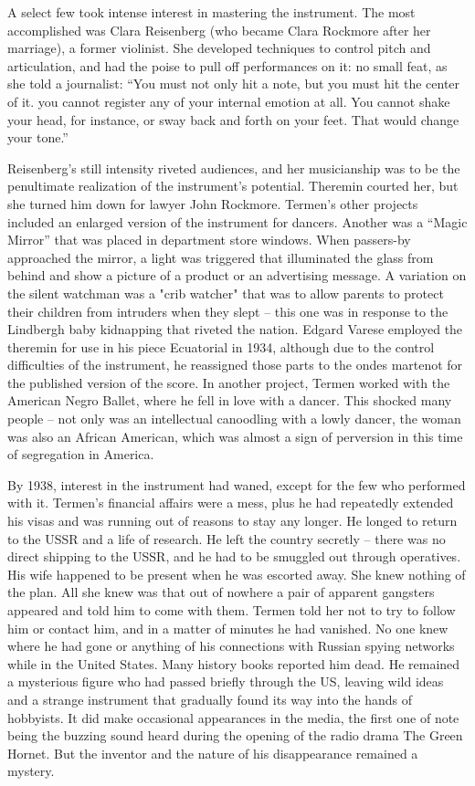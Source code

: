 A select few took intense interest in mastering the instrument. The most accomplished was Clara Reisenberg (who became Clara Rockmore after her marriage), a former violinist. She developed techniques to control pitch and articulation, and had the poise to pull off performances on it: no small feat, as she told a journalist: ``You must not only hit a note, but you must hit the center of it. you cannot register any of your internal emotion at all. You cannot shake your head, for instance, or sway back and forth on your feet. That would change your tone.''

Reisenberg's still intensity riveted audiences, and her musicianship was to be the penultimate realization of the instrument's potential. Theremin courted her, but she turned him down for lawyer John Rockmore. Termen's other projects included an enlarged version of the instrument for dancers. Another was a ``Magic Mirror'' that was placed in department store windows. When passers-by approached the mirror, a light was triggered that illuminated the glass from behind and show a picture of a product or an advertising message. A variation on the silent watchman was a "crib watcher" that was to allow parents to protect their children from intruders when they slept -- this one was in response to the Lindbergh baby kidnapping that riveted the nation. Edgard Varese employed the theremin for use in his piece Ecuatorial in 1934, although due to the control difficulties of the instrument, he reassigned those parts to the ondes martenot for the published version of the score. In another project, Termen worked with the American Negro Ballet, where he fell in love with a dancer. This shocked many people -- not only was an intellectual canoodling with a lowly dancer, the woman was also an African American, which was almost a sign of perversion in this time of segregation in America.

By 1938, interest in the instrument had waned, except for the few who performed with it. Termen's financial affairs were a mess, plus he had repeatedly extended his visas and was running out of reasons to stay any longer. He longed to return to the USSR and a life of research. He left the country secretly -- there was no direct shipping to the USSR, and he had to be smuggled out through operatives. His wife happened to be present when he was escorted away. She knew nothing of the plan. All she knew was that out of nowhere a pair of apparent gangsters appeared and told him to come with them. Termen told her not to try to follow him or contact him, and in a matter of minutes he had vanished. No one knew where he had gone or anything of his connections with Russian spying networks while in the United States. Many history books reported him dead. He remained a mysterious figure who had passed briefly through the US, leaving wild ideas and a strange instrument that gradually found its way into the hands of hobbyists. It did make occasional appearances in the media, the first one of note being the buzzing sound heard during the opening of the radio drama The Green Hornet. But the inventor and the nature of his disappearance remained a mystery.

